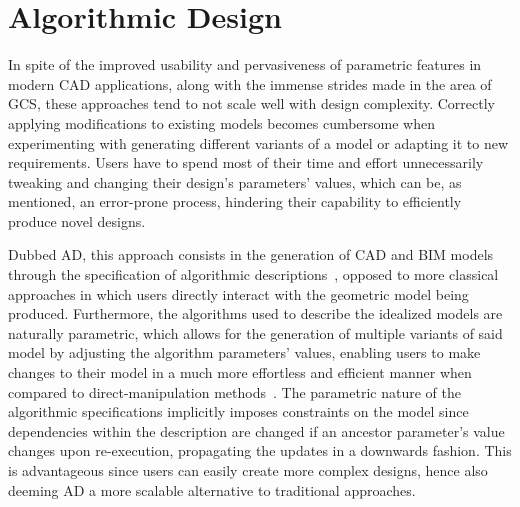 \section{Algorithmic Design}%
\label{sec:intro.ad}

In spite of the improved usability and pervasiveness of parametric features in
modern \ac{CAD} applications, along with the immense strides made in the area of
\ac{GCS}, these approaches tend to not scale well with design complexity.
Correctly applying modifications to existing models becomes cumbersome when
experimenting with generating different variants of a model or adapting it to
new requirements.  Users have to spend most of their time and effort
unnecessarily tweaking and changing their design's parameters' values, which can
be, as mentioned, an error-prone process, hindering their capability to
efficiently produce novel designs.

Dubbed \ac{AD}, this approach consists in the generation of \ac{CAD} and
\ac{BIM} models through the specification of algorithmic
descriptions~\cite{McCormack:2004:GDPDR}, opposed to more classical approaches
in which users directly interact with the geometric model being produced.
Furthermore, the algorithms used to describe the idealized models are naturally
parametric, which allows for the generation of multiple variants of said model
by adjusting the algorithm parameters' values, enabling users to make changes to
their model in a much more effortless and efficient manner when compared to
direct-manipulation methods~\cite{Leitao:2013:PESLGD}.  The parametric nature of
the algorithmic specifications implicitly imposes constraints on the model since
dependencies within the description are changed if an ancestor parameter's value
changes upon re-execution, propagating the updates in a downwards fashion.  This
is advantageous since users can easily create more complex designs, hence also
deeming \ac{AD} a more scalable alternative to traditional approaches.

